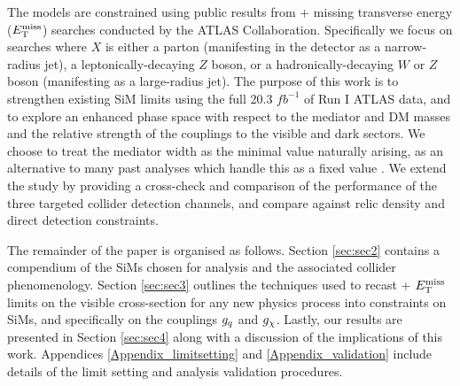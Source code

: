 The models are constrained using public results from \monoX + missing transverse energy ($E_{\mathrm{T}}^{\mathrm{miss}}$) searches conducted by the ATLAS Collaboration. Specifically we focus on searches where $X$ is either a parton (manifesting in the detector as a narrow-radius jet), a leptonically-decaying $Z$ boson, or a hadronically-decaying $W$ or $Z$ boson (manifesting as a large-radius jet). The purpose of this work is to strengthen existing SiM limits \cite{NordstromSVD, Zurek:tchannel} using the full 20.3 $fb^{-1}$ of Run I ATLAS data, and to explore an enhanced phase space with respect to the mediator and DM masses and the relative strength of the couplings to the visible and dark sectors.
We choose to treat the mediator width as the minimal value naturally arising, as an alternative to many past analyses which handle this as a fixed value \cite{}. We extend the study by providing a cross-check and comparison of the performance of the three targeted collider detection channels, and compare against relic density and direct detection constraints.

The remainder of the paper is organised as follows. Section \ref{sec:sec2} contains a compendium of the SiMs chosen for analysis and the associated collider phenomenology. Section \ref{sec:sec3} outlines the techniques used to recast \monoX + $E_{\mathrm{T}}^{\mathrm{miss}}$ limits on the visible cross-section for any new physics process into constraints on SiMs, and specifically on the couplings $g_q$ and $g_{\chi}$. Lastly, our results are presented in Section \ref{sec:sec4} along with a discussion of the implications of this work. Appendices \ref{Appendix_limitsetting} and \ref{Appendix_validation} include  details of the limit setting and analysis validation procedures.
